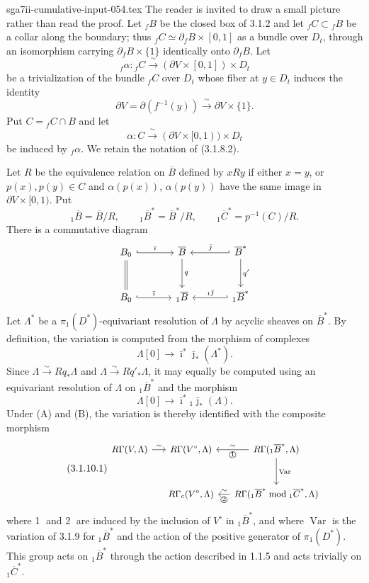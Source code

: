 \begin{filecontents*}{sga7ii-cumulative-input-054.tex}
The reader is invited to draw a small picture rather than read the
proof.  Let ${}_fB$ be the closed box of 3.1.2 and let
${}_fC\subset{}_fB$ be a collar along the boundary; thus
${}_fC\simeq\partial_fB\times[0,1]$ as a bundle over $D_t$, through
an isomorphism carrying $\partial_fB\times\{1\}$ identically onto
$\partial_fB$.  Let
\[
{}_f\alpha:{}_fC\xrightarrow{\ \sim\ }
(\partial V\times[0,1])\times D_t
\]
be a trivialization of the bundle ${}_fC$ over $D_t$ whose fiber at
$y\in D_t$ induces the identity
\[
\partial V=\partial(f^{-1}(y))
\xrightarrow{\ \sim\ }\partial V\times\{1\}.
\]
Put $C={}_fC\cap B$ and let
\[
\alpha:C\xrightarrow{\ \sim\ }
(\partial V\times[0,1))\times D_t
\]
be induced by ${}_f\alpha$.  We retain the notation of (3.1.8.2).

Let $R$ be the equivalence relation on $\overline B$ defined by
$xRy$ if either $x=y$, or $p(x),p(y)\in C$ and
$\alpha(p(x))$, $\alpha(p(y))$ have the same image in
$\partial V\times[0,1)$.  Put
\[
{}_1\overline B=\overline B/R,
\qquad
{}_1\overline B^*=\overline B^*/R,
\qquad
{}_1\overline C^*=p^{-1}(C)/R.
\]
There is a commutative diagram
\[
\begin{tikzcd}[column sep=large,row sep=large]
B_0 \arrow[r,hook,"\bar\imath"] \arrow[d,equal]
  & \overline B \arrow[d,"q"]
  & \overline B^* \arrow[l,hook',"\bar\jmath"'] \arrow[d,"q'"] \\
B_0 \arrow[r,hook,"\bar\imath"]
  & {}_1\overline B
  & {}_1\overline B^* \arrow[l,hook',"{}_1\bar\jmath"']
\end{tikzcd}
\]
Let $\Lambda^*$ be a $\pi_1(D^*)$-equivariant resolution of
$\Lambda$ by acyclic sheaves on $\overline B^*$.  By definition, the
variation is computed from the morphism of complexes
\[
\Lambda[0]\longrightarrow
\bar\imath^*\bar\jmath_*(\Lambda^*).
\]
Since $\Lambda\xrightarrow{\sim}Rq_*\Lambda$ and
$\Lambda\xrightarrow{\sim}Rq'_*\Lambda$, it may equally be computed
using an equivariant resolution of $\Lambda$ on
${}_1\overline B^*$ and the morphism
\[
\Lambda[0]\longrightarrow
\bar\imath^*{}_1\bar\jmath_*(\Lambda).
\]
Under (A) and (B), the variation is thereby identified with the
composite morphism
\begin{equation}\tag{3.1.10.1}
\begin{tikzcd}[column sep=small,row sep=large,cells={nodes={font=\small}}]
R\Gamma(V,\Lambda) \arrow[r,"\sim"]
  & R\Gamma(V^\circ,\Lambda)
  & R\Gamma({}_1\overline B^*,\Lambda)
      \arrow[l,"\sim"',"\text{\textcircled{1}}"]
      \arrow[d,"\operatorname{Var}"] \\
{}
  & R\Gamma_c(V^\circ,\Lambda)
  & R\Gamma({}_1\overline B^*\bmod{}_1\overline C^*,\Lambda)
      \arrow[l,"\sim"',"\text{\textcircled{2}}"]
\end{tikzcd}
\end{equation}
where \textcircled{1} and \textcircled{2} are induced by the inclusion
of $V^\circ$ in ${}_1\overline B^*$, and where
$\operatorname{Var}$ is the variation of 3.1.9 for
${}_1\overline B^*$ and the action of the positive generator of
$\pi_1(D^*)$.  This group acts on ${}_1\overline B^*$ through the
action described in 1.1.5 and acts trivially on
${}_1\overline C^*$.


\end{filecontents*}
